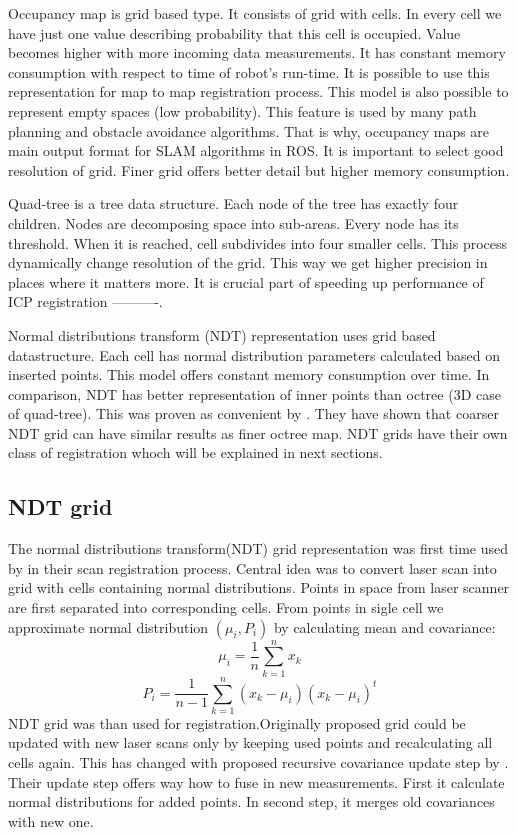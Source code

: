 Occupancy map is grid based type. It consists of grid with cells. In every cell we have just one value describing probability that this cell is occupied. Value becomes higher with more incoming data measurements. It has constant memory consumption with respect to time of robot's run-time. It is possible to use this representation for map to map registration process. This model is also possible to represent empty spaces (low probability). This feature is used by many path planning and obstacle avoidance algorithms. That is why, occupancy maps are main output format for SLAM algorithms in ROS. It is important to select good resolution of grid. Finer grid offers better detail but higher memory consumption.

Quad-tree is a tree data structure. Each node of the tree has exactly four children. Nodes are decomposing space into sub-areas. Every node has its threshold. When it is reached, cell subdivides into four smaller cells. This process dynamically change resolution of the grid. This way we get higher precision in places where it matters more. It is crucial part of speeding up performance of ICP registration  ----------.

Normal distributions transform (NDT) representation uses grid based datastructure. Each cell has normal distribution parameters calculated based on inserted points. This model offers constant memory consumption over time. In comparison, NDT has better representation of inner points than octree (3D case of quad-tree). This was proven as convenient by . They have shown that coarser NDT grid can have similar results as finer octree map. NDT grids have their own class of registration whoch will be explained in next sections.     
\newpage


\subsection{NDT grid}
The normal distributions transform(NDT) grid representation was first time used by \cite{Biber03} in their scan registration process. Central idea was to convert laser scan into grid with cells containing normal distributions. Points in space from laser scanner are first separated into corresponding cells. From points in sigle cell we approximate normal distribution $(\mu_{i},P_{i})$ by calculating mean and covariance:
\begin{equation}
\mu_{i} = \dfrac{1}{n}\sum_{k=1}^{n}x_{k}
\end{equation}  
\begin{equation}
P_{i} = \dfrac{1}{n-1}\sum_{k=1}^{n}(x_{k}-\mu_{i})(x_{k}-\mu_{i})^{t}
\end{equation} 
NDT grid was than used for registration.Originally proposed grid could be updated with new laser scans only by keeping used points and recalculating all cells again. This has changed with proposed recursive covariance update step by \cite{Saarinen13}. Their update step offers way how to fuse in new measurements. First it calculate normal distributions for added points. In second step, it merges old covariances with new one.

